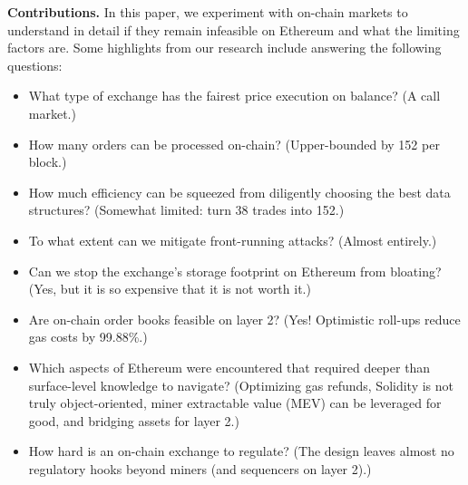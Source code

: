 \textbf{Contributions.} In this paper, we experiment with on-chain markets to understand in detail if they remain infeasible on Ethereum and what the limiting factors are. Some highlights from our research include answering the following questions:
\begin{itemize}
\item What type of exchange has the fairest price execution on balance? (A call market.)
\item How many orders can be processed on-chain? (Upper-bounded by 152 per block.)
\item How much efficiency can be squeezed from diligently choosing the best data structures? (Somewhat limited: turn 38 trades into 152.)
\item To what extent can we mitigate front-running attacks? (Almost entirely.)
\item Can we stop the exchange's storage footprint on Ethereum from bloating? (Yes, but it is so expensive that it is not worth it.)
\item Are on-chain order books feasible on layer 2? (Yes! Optimistic roll-ups reduce gas costs by 99.88\%.)
\item Which aspects of Ethereum were encountered that required deeper than surface-level knowledge to navigate? (Optimizing gas refunds, Solidity is not truly object-oriented, miner extractable value (MEV) can be leveraged for good, and bridging assets for layer 2.)
\item How hard is an on-chain exchange to regulate? (The design leaves almost no regulatory hooks beyond miners (and sequencers on layer 2).)
\end{itemize}


 


